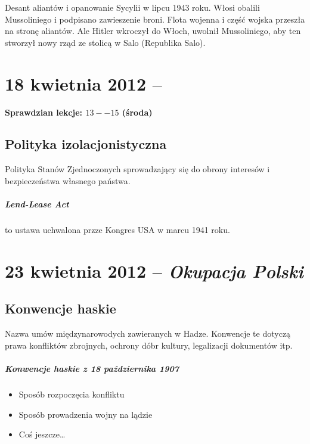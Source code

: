 \documentclass [a4paper, 11pt, oneside]{book}
\begin{document}
Desant aliantów i opanowanie Sycylii w lipcu 1943 roku. Włosi obalili Mussoliniego i podpisano zawieszenie broni. Flota wojenna i część wojska przeszła na stronę aliantów. Ale Hitler wkroczył do Włoch, uwolnił Mussoliniego, aby ten stworzył nowy rząd ze stolicą w Salo (Republika Salo).

\chapter{18 kwietnia 2012 -- \textit{}}

\begin{center}
\textbf{Sprawdzian lekcje: $13 -- 15$ (środa)}
\end{center}

\section{Polityka izolacjonistyczna}

Polityka Stanów Zjednoczonych sprowadzający się do obrony interesów i bezpieczeństwa własnego państwa.

\paragraph{Lend-Lease Act} to ustawa uchwalona przze Kongres USA w marcu 1941 roku.

\chapter{23 kwietnia 2012 -- \textit{Okupacja Polski}}

\section{Konwencje haskie}

Nazwa umów międzynarowodych zawieranych w Hadze. Konwencje te dotyczą prawa konfliktów zbrojnych, ochrony dóbr kultury, legalizacji dokumentów itp.


\paragraph{Konwencje haskie z 18 października 1907}
\begin{itemize}
	\item Sposób rozpoczęcia konfliktu
	\item Sposób prowadzenia wojny na lądzie
	\item Coś jeszcze\dots
\end{itemize}
\end{document}
